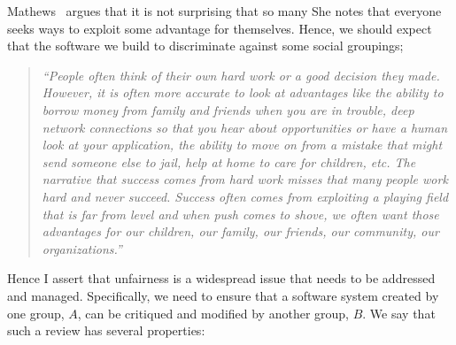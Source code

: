  
Mathews~\cite{mathews23} argues that it is not surprising that so many She  notes that everyone seeks ways to exploit some advantage for themselves. Hence, we should
expect that the software we build to discriminate against some social groupings;
\begin{quote}

{\em 
    ``People often think of their own hard work or a good decision they made. However, it is often more accurate to look at advantages like the ability to borrow money from family and friends when you are in trouble, deep network connections so that you hear about opportunities or have a human look at your application,  the ability to move on from a mistake that might send someone else to jail, help at home to care for children,  etc. The narrative that success comes from hard work misses that many people work hard and never succeed. Success often comes from exploiting a playing field that is far from level and when push comes to shove, we often want those advantages for our children, our family, our friends, our community, our organizations.''}
 \end{quote}
Hence I assert that
unfairness is a widespread issue that needs to be addressed and managed. 
Specifically, we need 
to ensure that a software system created by one group, $A$, can be critiqued and modified by another group, $B$.
We say that such a review has several properties:

